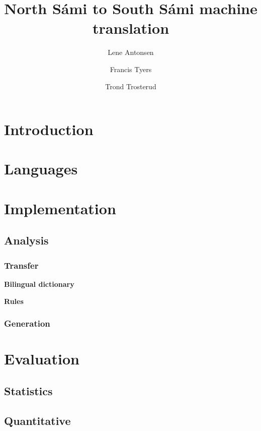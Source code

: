 \documentclass[a4paper,11pt,twocolumn]{article}
\title{North Sámi to South Sámi machine translation}
\author{Lene Antonsen \and Francis Tyers \and Trond Trosterud}
\date{}
\begin{document}
\maketitle

\section{Introduction}

\cite{tyers09} \cite{wiechetek10} \cite{trosterud12}

\section{Languages}


\section{Implementation}


\subsection{Analysis}

\subsubsection{Transfer}

\textbf{Bilingual dictionary}

\textbf{Rules}

\subsubsection{Generation}

\section{Evaluation}

\subsection{Statistics}


\subsection{Quantitative}
\end{document}
